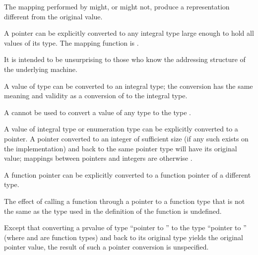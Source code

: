 \pnum
\begin{note}
The mapping performed by  might, or might not, produce a
representation different from the original value.
\end{note}

\pnum
{}%
%
A pointer can be explicitly converted to any integral type large enough
to hold all values of its type.
%
The mapping function is .
\begin{note}
It is intended to be unsurprising to those who know the addressing
structure of the underlying machine.
\end{note}
A value of type  can be converted to an integral
type; the conversion has the same meaning and validity as a conversion of
 to the integral type.
\begin{note}
A 
cannot be used to convert a value of any type to the type
.
\end{note}

\pnum
{}%
%
A value of integral type or enumeration type can be explicitly converted
to a pointer. A pointer converted to an integer of sufficient size (if
any such exists on the implementation) and back to the same pointer type
will have its original value;
%
mappings between pointers and integers are otherwise
.

\pnum
{}%
%
%
A function pointer can be explicitly converted
to a function pointer of a different type.
%
\begin{note}
The effect of calling a function through a pointer to a function
type that is not the same as the type used in the
definition of the function is undefined.
\end{note}
Except that converting
a prvalue of type ``pointer to '' to the type ``pointer to
'' (where  and  are function types) and
back to its original type yields the original pointer value, the result
of such a pointer conversion is unspecified.

